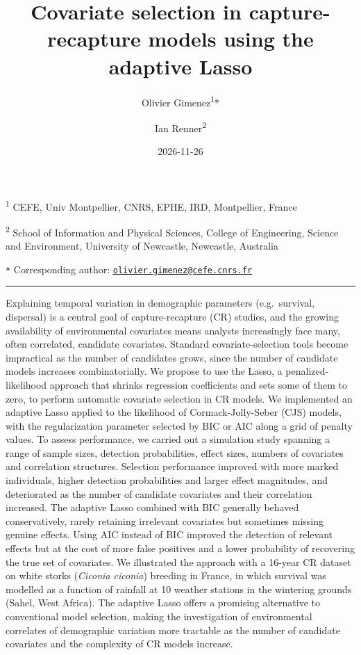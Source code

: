 \documentclass[
  11pt,
  a4paper,
]{article}
\title{Covariate selection in capture-recapture models using the adaptive Lasso}
\author{Olivier Gimenez\textsuperscript{1}* \and Ian Renner\textsuperscript{2}}
\date{2026-11-26}
\begin{document}
\maketitle

\small

\textsuperscript{1} CEFE, Univ Montpellier, CNRS, EPHE, IRD, Montpellier, France

\textsuperscript{2} School of Information and Physical Sciences, College of Engineering, Science and Environment, University of Newcastle, Newcastle, Australia

\texttt{*} Corresponding author: \href{mailto:olivier.gimenez@cefe.cnrs.fr}{\nolinkurl{olivier.gimenez@cefe.cnrs.fr}}

\normalsize

\vspace{1cm}
\hrule

Explaining temporal variation in demographic parameters (e.g.~survival, dispersal) is a central goal of capture-recapture (CR) studies, and the growing availability of environmental covariates means analysts increasingly face many, often correlated, candidate covariates. Standard covariate-selection tools become impractical as the number of candidates grows, since the number of candidate models increases combinatorially. We propose to use the Lasso, a penalized-likelihood approach that shrinks regression coefficients and sets some of them to zero, to perform automatic covariate selection in CR models. We implemented an adaptive Lasso applied to the likelihood of Cormack-Jolly-Seber (CJS) models, with the regularization parameter selected by BIC or AIC along a grid of penalty values. To assess performance, we carried out a simulation study spanning a range of sample sizes, detection probabilities, effect sizes, numbers of covariates and correlation structures. Selection performance improved with more marked individuals, higher detection probabilities and larger effect magnitudes, and deteriorated as the number of candidate covariates and their correlation increased. The adaptive Lasso combined with BIC generally behaved conservatively, rarely retaining irrelevant covariates but sometimes missing genuine effects. Using AIC instead of BIC improved the detection of relevant effects but at the cost of more false positives and a lower probability of recovering the true set of covariates. We illustrated the approach with a 16-year CR dataset on white storks (\emph{Ciconia ciconia}) breeding in France, in which survival was modelled as a function of rainfall at 10 weather stations in the wintering grounds (Sahel, West Africa). The adaptive Lasso offers a promising alternative to conventional model selection, making the investigation of environmental correlates of demographic variation more tractable as the number of candidate covariates and the complexity of CR models increase.
\end{document}
